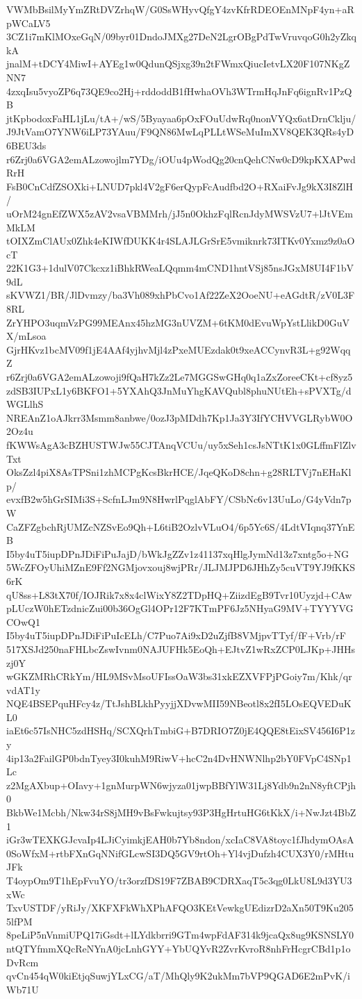 VWMbBsilMyYmZRtDVZrhqW/G0SsWHyvQfgY4zvKfrRDEOEnMNpF4yn+aRpWCaLV5
3CZ1i7mKlMOxeGqN/09byr01DndoJMXg27DeN2LgrOBgPdTwVruvqoG0h2yZkqkA
jnalM+tDCY4MiwI+AYEg1w0QdunQSjxg39n2tFWmxQiucIetvLX20F107NKgZNN7
4zxqIsu5vyoZP6q73QE9co2Hj+rddoddB1fHwhaOVh3WTrmHqJnFq6ignRv1PzQB
jtKpbodoxFaHL1jLu/tA+/wS/5Byayaa6pOxFOuUdwRq0nonVYQx6atDrnCklju/
J9JtVamO7YNW6iLP73YAuu/F9QN86MwLqPLLtWSeMuImXV8QEK3QRs4yD6BEU3ds
r6Zrj0a6VGA2emALzowojlm7YDg/iOUu4pWodQg20cnQehCNw0cD9kpKXAPwdRrH
FsB0CnCdfZSOXki+LNUD7pkl4V2gF6erQypFcAudfbd2O+RXaiFvJg9kX3I8ZlH/
uOrM24gnEfZWX5zAV2vsaVBMMrh/jJ5n0OkhzFqlRcnJdyMWSVzU7+lJtVEmMkLM
tOIXZmClAUx0Zhk4eKIWfDUKK4r4SLAJLGrSrE5vmiknrk73ITKv0Yxmz9z0aOcT
22K1G3+1dulV07Ckcxz1iBhkRWeaLQqmm4mCND1hntVSj85nsJGxM8UI4F1bV9dL
sKVWZ1/BR/JlDvmzy/ba3Vh089xhPbCvo1Af22ZeX2OoeNU+eAGdtR/zV0L3F8RL
ZrYHPO3uqmVzPG99MEAnx45hzMG3nUVZM+6tKM0dEvuWpYstLlikD0GuVX/mLsoa
GjrHKvz1bcMV09f1jE4AAf4yjhvMjl4zPxeMUEzdak0t9xeACCynvR3L+g92WqqZ
r6Zrj0a6VGA2emALzowoji9fQaH7kZz2Le7MGGSwGHq0q1aZxZoreeCKt+cf8yz5
zdSB3IUPxL1y6BKFO1+5YXAhQ3JnMuYhgKAVQubl8phuNUtEh+sPVXTg/dWGLlhS
NREAnZ1oAJkrr3Msmm8anbwe/0ozJ3pMDdh7Kp1Ja3Y3IfYCHVVGLRybW0O2Oz4u
fKWWsAgA3cBZHUSTWJw55CJTAnqVCUu/uy5xSeh1csJsNTtK1x0GLffmFlZlvTxt
OksZzl4piX8AsTPSni1zhMCPgKcsBkrHCE/JqeQKoD8chn+g28RLTVj7nEHaKlp/
evxfB2w5hGrSIMi3S+ScfnLJm9N8HwrlPqglAbFY/CSbNc6v13UuLo/G4yVdn7pW
CaZFZgbchRjUMZcNZSvEo9Qh+L6tiB2OzlvVLuO4/6p5Yc6S/4LdtVIqnq37YnEB
I5by4uT5iupDPnJDiFiPuJajD/bWkJgZZv1z41137xqHlgJymNd13z7xntg5o+NG
5WcZFOyUhiMZnE9Ff2NGMjovxouj8wjPRr/JLJMJPD6JHhZy5cuVT9YJ9fKKS6rK
qU8ss+L83tX70f/IOJRik7x8x4clWixY8Z2TDpHQ+ZiizdEgB9Tvr10Uyzjd+CAw
pLUczW0hETzdnicZui00b36OgGl4OPr12F7KTmPF6Jz5NHyaG9MV+TYYYVGCOwQ1
I5by4uT5iupDPnJDiFiPuIcELh/C7Puo7Ai9xD2uZjfB8VMjpvTTyf/fF+Vrb/rF
517XSJd250naFHLbcZswIvnm0NAJUFHk5EoQh+EJtvZ1wRxZCP0LJKp+JHHszj0Y
wGKZMRhCRkYm/HL9MSvMsoUFIssOaW3bs31xkEZXVFPjPGoiy7m/Khk/qrvdAT1y
NQE4BSEPquHFcy4z/TtJshBLkhPyyjjXDvwMII59NBeotl8x2fI5LOsEQVEDuKL0
iaEt6c57IsNHC5zdHSHq/SCXQrhTmbiG+B7DRIO7Z0jE4QQE8tEixSV456I6P1zy
4ip13a2FailGP0bdnTyey3I0kuhM9RiwV+hcC2n4DvHNWNlhp2bY0FVpC4SNp1Lc
z2MgAXbup+OIavy+1gnMurpWN6wjyza01jwpBBfYlW31Lj8Ydb9n2nN8yftCPjh0
BkbWe1Mcbh/Nkw34rS8jMH9vBsFwkujtsy93P3HgHrtuHG6tKkX/i+NwJzt4BbZ1
iGr3wTEXKGJcvaIp4LJiCyimkjEAH0b7Yb8ndon/xcIaC8VA8toyc1fJhdymOAsA
0SoWfxM+rtbFXnGqNNifGLcwSI3DQ5GV9rtOh+Yl4vjDufzh4CUX3Y0/rMHtuJFk
T4oypOm9T1hEpFvuYO/tr3orzfDS19F7ZBAB9CDRXaqT5c3qg0LkU8L9d3YU3xWc
TxvUSTDF/yRiJy/XKFXFkWhXPhAFQO3KEtVewkgUEdizrD2aXn50T9Ku2055lfPM
8peLiP5nVnmiUPQ17iGsdt+lLYdkbrri9GTm4wpFdAF314k9jcaQx8ug9KSNSLY0
ntQTYfmmXQcReNYnA0jcLnhGYY+YbUQYvR2ZvrKvroR8nhFrHcgrCBd1p1oDvRcm
qvCn454qW0kiEtjqSuwjYLxCG/aT/MhQly9K2ukMm7bVP9QGAD6E2mPvK/iWb71U
